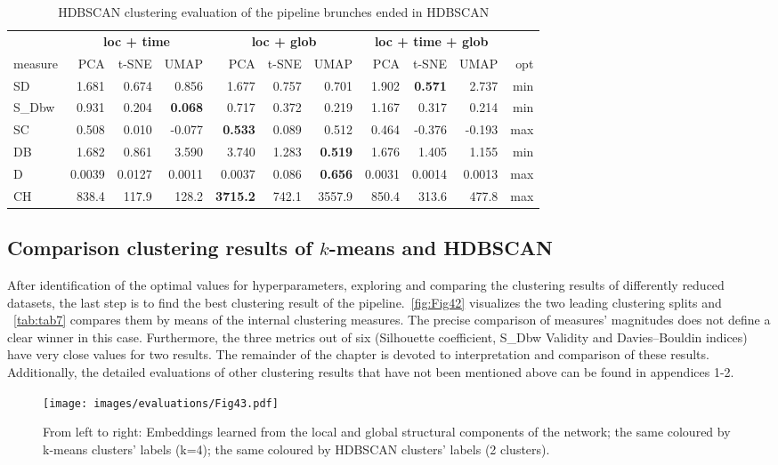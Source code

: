 \begin{table}
\begin{center}
\small
\begin{tabular}{lrrrrrrrrrr}
\hline
\multicolumn{1}{l}{ } & \multicolumn{3}{c}{\textbf{loc + time}} & \multicolumn{3}{c}{\textbf{loc + glob}} & \multicolumn{3}{c}{\textbf{loc + time + glob}} \\
\cline{1-1} \cline{2-4} \cline{5-7} \cline{8-10} 
measure & PCA & t-SNE & UMAP & PCA & t-SNE & UMAP & PCA & t-SNE & UMAP & opt\\
\hline
SD     & 1.681 & 0.674 & 0.856 & 1.677 & 0.757 & 0.701 & 1.902 & \textbf{0.571} & 2.737 & min \\
S\_Dbw & 0.931 & 0.204 & \textbf{0.068} & 0.717 & 0.372 & 0.219 & 1.167 & 0.317 & 0.214 & min \\
SC     & 0.508 & 0.010 & -0.077 & \textbf{0.533} & 0.089 & 0.512 & 0.464 & -0.376 & -0.193 & max \\
DB     & 1.682 & 0.861 & 3.590 & 3.740 & 1.283 & \textbf{0.519} & 1.676 & 1.405 & 1.155 & min \\
D      & 0.0039 & 0.0127 & 0.0011 & 0.0037 & 0.086 & \textbf{0.656} & 0.0031 & 0.0014 & 0.0013&max\\
CH     & 838.4 & 117.9 & 128.2 & \textbf{3715.2} & 742.1 & 3557.9 & 850.4 & 313.6 & 477.8 & max \\
\hline
\end{tabular}
\caption {HDBSCAN clustering evaluation of the pipeline brunches ended in HDBSCAN}
\label{tab:tab6}
\end{center}
\end {table}

\subsection{Comparison clustering results of $k$-means and HDBSCAN}
\label{Comparison clustering results of $k$-means and HDBSCAN}

After identification of the optimal values for hyperparameters, exploring and comparing the clustering results of differently reduced datasets, the last step is to find the best clustering result of the pipeline.~\autoref{fig:Fig42} visualizes the two leading clustering splits and ~\autoref{tab:tab7} compares them by means of the internal clustering measures. The precise comparison of measures' magnitudes does not define a clear winner in this case. Furthermore, the three metrics out of six (Silhouette coefficient, S\_Dbw Validity and Davies–Bouldin indices) have very close values for two results. The remainder of the chapter is devoted to interpretation and comparison of these results. Additionally, the detailed evaluations of other clustering results that have not been mentioned above can be found in appendices 1-2.
\begin{figure}[!ht]
	\centering
	\texttt{[image: images/evaluations/Fig43.pdf]}\\
	\caption{From left to right: Embeddings learned from the local and global structural components of the network; the same coloured by k-means clusters' labels (k=4); the same coloured by HDBSCAN clusters' labels (2 clusters).}
	\label{fig:Fig43}
\end{figure}

